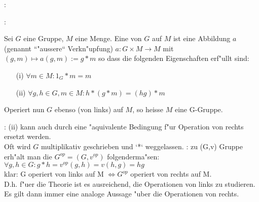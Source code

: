 
\example{}:{
		    }	

:
  {
   
   Sei $G$ eine Gruppe, 
   $M$ eine Menge. Eine \emph{} von $G$ auf $M$ ist eine Abbildung $a$
   (genannt ``"aussere`` Verkn"upfung) $a: G \times M \longrightarrow M $ mit
   $(g,m) \mapsto a(g,m) := g*m $ so dass die folgenden Eigenschaften erf"ullt sind:
   \begin{enumerate}
   \item[(i)]  $ \forall  m \in M: 1_G * m = m$
   \item[(ii)]  $ \forall  g, h \in G, m \in M: h*(g*m) = (hg)*m$
   \end{enumerate}		
 
   Operiert nun $G$ ebenso (von links) auf $M$, so heisse $M$ eine G-Gruppe.	
								     }		    
:{
  (ii) kann auch durch eine "aquivalente Bedingung f"ur Operation
  von rechts ersetzt werden.\\
  Oft wird $G$ multiplikativ geschrieben und `*` weggelassen.} 
:{
  zu (G,v) Gruppe erh"alt man die {\emph {}} $G^{op} = (G,v^{op})$ folgender\-ma"sen: \\
  $\forall g,h \in G: g*h = v^{op}(g,h) = v(h,g) = hg $\\
  klar: G operiert von links auf M $\Leftrightarrow G^{op}$ operiert von rechts auf M. \\
  D.h. f"uer die Theorie ist es ausreichend, die Operationen von links zu studieren. 
  Es gilt dann immer eine analoge Aussage "uber die Operationen von rechts.}
